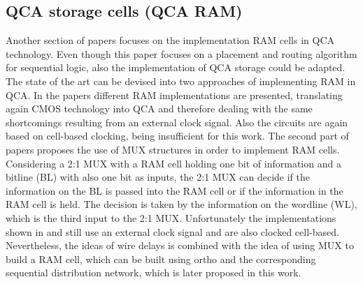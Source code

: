 \subsection{QCA storage cells (QCA RAM)}\label{subsec:RAM_SoA}
Another section of papers focuses on the implementation RAM cells in QCA technology. Even though this paper focuses on a placement and routing algorithm for sequential logic, also the implementation of QCA storage could be adapted. The state of the art can be devised into two approaches of implementing RAM in QCA. In the papers \cite{RAM_overview, crosstalk, RAM_cell} different RAM implementations are presented, translating again CMOS technology into QCA and therefore dealing with the same shortcomings resulting from an external clock signal. Also the circuits are again based on cell-based clocking, being insufficient for this work. The second part of papers \cite{ahmad2018optimal, majeed2019optimal} proposes the use of MUX structures in order to implement RAM cells. Considering a 2:1 MUX with a RAM cell holding one bit of information and a bitline (BL) with also one bit as inputs, the 2:1 MUX can decide if the information on the BL is passed into the RAM cell or if the information in the RAM cell is held. The decision is taken by the information on the wordline (WL), which is the third input to the 2:1 MUX. Unfortunately the implementations shown in \cite{ahmad2018optimal} and \cite{majeed2019optimal} still use an external clock signal and are also clocked cell-based. Nevertheless, the ideas of wire delays is combined with the idea of using MUX to build a RAM cell, which can be built using ortho and the corresponding sequential distribution network, which is later proposed in this work.
